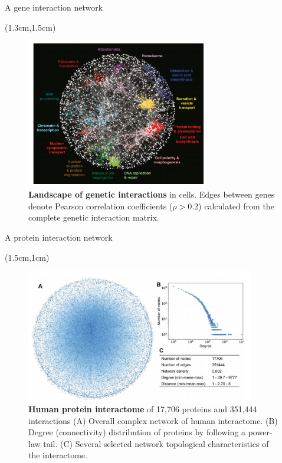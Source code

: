 \documentclass[aspectratio=1610]{beamer}					%
\begin{document}
\begin{frame}{A gene interaction network}
\begin{center}
\begin{textblock*}{13cm}(1.3cm,1.5cm)
\begin{figure}
\includegraphics[width=8cm]{gene-network.png}
\caption{\textbf{Landscape of genetic interactions} in cells. Edges between genes denote Pearson correlation coefficients ($\rho > 0.2$) calculated from the
complete genetic interaction matrix.}
\end{figure}
\end{textblock*}
\end{center}
\end{frame}

\begin{frame}{A protein interaction network}
\begin{center}
\begin{textblock*}{13cm}(1.5cm,1cm)
\begin{figure}
\includegraphics[width=10cm]{protein-interactome.png}
\caption{\textbf{Human protein interactome} of 17,706 proteins and 351,444 interactions (A) Overall complex network of human interactome. (B) Degree
(connectivity) distribution of proteins by following a power-law tail. (C) Several selected network topological characteristics of the interactome.}
\end{figure}
\end{textblock*}
\end{center}
\end{frame}
\end{document}
